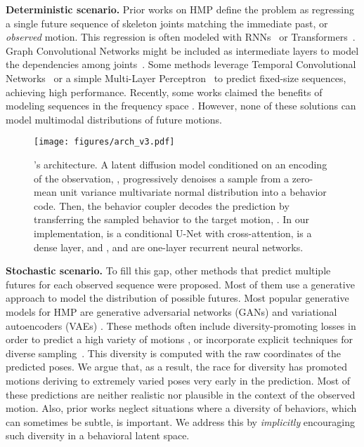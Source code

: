 \documentclass[10pt,twocolumn,letterpaper]{article}
\begin{document}
\textbf{Deterministic scenario.}
Prior works on HMP define the problem as regressing a single future sequence of skeleton joints matching the immediate past, or \textit{observed} motion. This regression is often modeled with RNNs~\cite{fragkiadaki2015recurrent, jain2016structural, martinez2017human, gui2018adversarial, pavllo2018quaternet, liu2019towards} or Transformers~\cite{aksan2021spatio, cai2020learning, martinez2021pose}. Graph Convolutional Networks might be included as intermediate layers to model the dependencies among joints~\cite{li2020dynamic, mao2019learning, dang2021msr, li2021skeleton}. Some methods leverage Temporal Convolutional Networks~\cite{li2018convolutional, medjaouri2022hr} or a simple Multi-Layer Perceptron~\cite{guo2022mlp} to predict fixed-size sequences, achieving high performance. Recently, some works claimed the benefits of modeling sequences in the frequency space \cite{cai2020learning, mao2019learning, mao2020history}. However, none of these solutions can model multimodal distributions of future motions. 


\begin{figure*}[t!]
    \centering
    \texttt{[image: figures/arch\_v3.pdf]}
\caption{\modelname{}'s architecture. A latent diffusion model conditioned on an encoding of the observation, , progressively denoises a sample from a zero-mean unit variance multivariate normal distribution into a behavior code. Then, the behavior coupler  decodes the prediction by transferring the sampled behavior to the target motion, . In our implementation,  is a conditional U-Net with cross-attention,  is a dense layer, and , and  are one-layer recurrent neural networks.}
    \label{fig:main_arch}
    \vspace{-0.2cm}
\end{figure*}

\textbf{Stochastic scenario.} 
To fill this gap, other methods that predict multiple futures for each observed sequence were proposed. Most of them use a generative approach to model the distribution of possible futures. Most popular generative models for HMP are generative adversarial networks (GANs) \cite{barsoum2018hpgan, kundu2019bihmpgan} and variational autoencoders (VAEs) \cite{walker2017theposeknows, yan2018mtvae, cai2021unified, mao2021gsps}. 
These methods often include diversity-promoting losses in order to predict a high variety of motions \cite{mao2021gsps}, or incorporate explicit techniques for diverse sampling~\cite{yuan2020dlow, dang2022diverse,xu2022diverse}. This diversity is computed with the raw coordinates of the predicted poses. We argue that, as a result, the race for diversity has promoted motions deriving to extremely varied poses very early in the prediction. Most of these predictions are neither realistic nor plausible in the context of the observed motion. Also, prior works neglect situations where a diversity of behaviors, which can sometimes be subtle, is important. We address this by \textit{implicitly} encouraging such diversity in a behavioral latent space.
\end{document}

